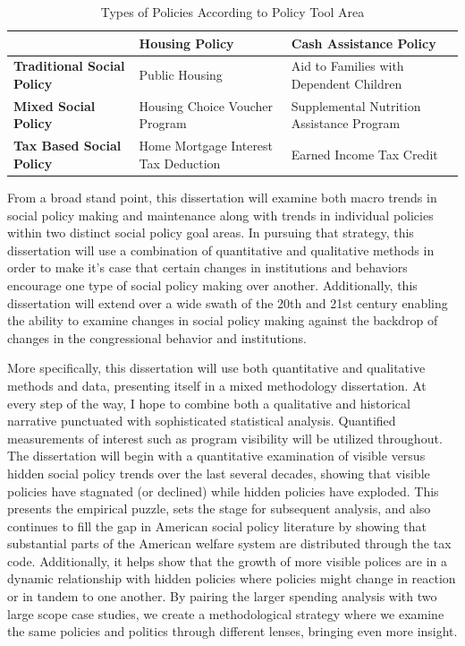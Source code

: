 \documentclass[12pt]{article}
\begin{document}
\begin{table}
\centering
    \begin{tabularx}{\textwidth}{XXX} \toprule
           & \textbf{Housing Policy} & \textbf{Cash Assistance Policy} \\ \midrule
    \textbf{Traditional Social Policy} & Public Housing        & Aid to Families with Dependent Children \\
        \textbf{Mixed Social Policy} & Housing Choice Voucher Program        & Supplemental Nutrition Assistance Program \\
    \textbf{Tax Based Social Policy} & Home Mortgage Interest Tax Deduction        & Earned Income Tax Credit \\ \bottomrule
    \end{tabularx}
  \caption{Types of Policies According to Policy Tool Area}
  \label{tab:types}
\end{table}

From a broad stand point, this dissertation will examine both macro trends in social policy making and maintenance along with trends in individual policies within two distinct social policy goal areas. In pursuing that strategy, this dissertation will use a combination of quantitative and qualitative methods in order to make it's case that certain changes in institutions and behaviors encourage one type of social policy making over another. Additionally, this dissertation will extend over a wide swath of the 20th and 21st century enabling the ability to examine changes in social policy making against the backdrop of changes in the congressional behavior and institutions.

More specifically, this dissertation will use both quantitative and qualitative methods and data, presenting itself in a mixed methodology dissertation. At every step of the way, I hope to combine both a qualitative and historical narrative punctuated with sophisticated statistical analysis. Quantified measurements of interest such as program visibility will be utilized throughout. The dissertation will begin with a quantitative examination of visible versus hidden social policy trends over the last several decades, showing that visible policies have stagnated (or declined) while hidden policies have exploded. This presents the empirical puzzle, sets the stage for subsequent analysis, and also continues to fill the gap in American social policy literature by showing that substantial parts of the American welfare system are distributed through the tax code. Additionally, it helps show that the growth of more visible polices are in a dynamic relationship with hidden policies where policies might change in reaction or in tandem to one another. By pairing the larger spending analysis with two large scope case studies, we create a methodological strategy where we examine the same policies and politics through different lenses, bringing even more insight.
\end{document}
